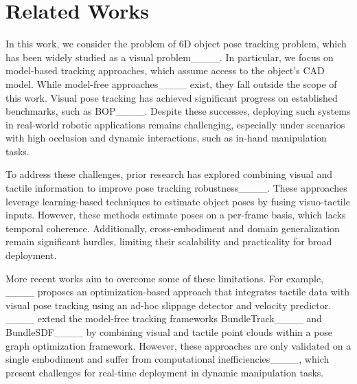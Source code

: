 \section{Related Works}
In this work, we consider the problem of 6D object pose tracking problem, which has been widely studied as a visual problem____.
In particular, we focus on model-based tracking approaches, which assume access to the object's CAD model. 
While model-free approaches____ exist, they fall outside the scope of this work.
Visual pose tracking has achieved significant progress on established benchmarks, such as BOP____.
Despite these successes, deploying such systems in real-world robotic applications remains challenging, especially under scenarios with high occlusion and dynamic interactions, such as in-hand manipulation tasks.

To address these challenges, prior research has explored combining visual and tactile information to improve pose tracking robustness____.
These approaches leverage learning-based techniques to estimate object poses by fusing visuo-tactile inputs. 
However, these methods estimate poses on a per-frame basis, which lacks temporal coherence. 
Additionally, cross-embodiment and domain generalization remain significant hurdles, limiting their scalability and practicality for broad deployment.

More recent works aim to overcome some of these limitations. 
For example, ____ proposes an optimization-based approach that integrates tactile data with visual pose tracking using an ad-hoc slippage detector and velocity predictor. 
____ extend the model-free tracking frameworks BundleTrack____ and BundleSDF____ by combining visual and tactile point clouds within a pose graph optimization framework. 
However, these approaches are only validated on a single embodiment and suffer from computational inefficiencies____, which present challenges for real-time deployment in dynamic manipulation tasks.